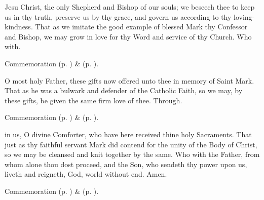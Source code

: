 \begin{tcolorbox}[
  colback=white,           %
  colframe=black,          %
  fonttitle=\itshape,     %
  title style={left=2mm},  %
  attach title to upper={},
  enhanced,
  boxed title style={size=small,colframe=black!50!white,colback=white},
]
\collect
\label{EphesianCollect}
 Jesu Christ, the only Shepherd and Bishop of our souls; we beseech thee to keep us in thy truth, preserve us by thy grace, and govern us according to thy loving-kindness. That as we imitate the good example of blessed Mark thy Confessor and Bishop, we may grow in love for thy Word and service of thy Church. Who with.

\begin{rubric}
    Commemoration  (p. \pageref{MariusEtcCollect}) \&  (p. \pageref{SPMaryPostChristmas}).
\end{rubric}

\secret
\label{EphesianSecret}
 O most holy Father, these gifts now offered unto thee in memory of Saint Mark. That as he was a bulwark and defender of the Catholic Faith, so we may, by these gifts, be given the same firm love of thee. Through.

\begin{rubric}
    Commemoration  (p. \pageref{MariusEtcSecret}) \&  (p. \pageref{SPMaryPostChristmas}).
\end{rubric}

\postcommunion
\label{EphesianPostcommunion}
 in us, O divine Comforter, who have here received thine holy Sacraments. That just as thy faithful servant Mark did contend for the unity of the Body of Christ, so we may be cleansed and knit together by the same. Who with the Father, from whom alone thou dost proceed, and the Son, who sendeth thy power upon us, liveth and reigneth, God, world without end. Amen.

\begin{rubric}
    Commemoration  (p. \pageref{MariusEtcPostcommunion}) \&  (p. \pageref{SPMaryPostChristmas}).
\end{rubric}

\end{tcolorbox}


